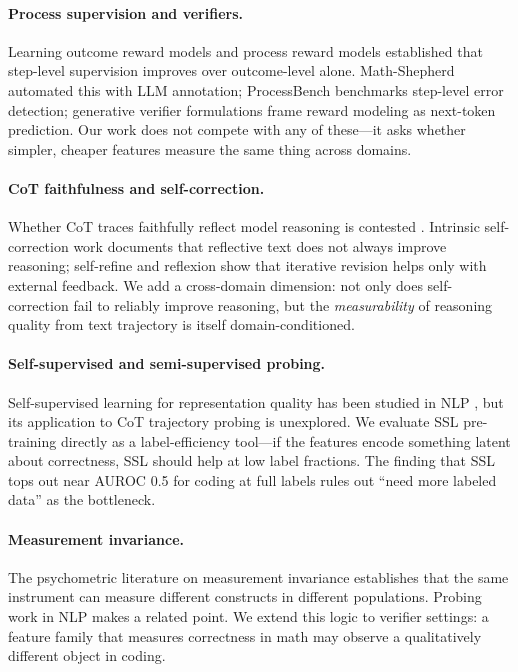 \documentclass[10pt,twocolumn]{article}
\begin{document}
\paragraph{Process supervision and verifiers.} Learning outcome reward models \citep{cobbe2021training} and process reward models \citep{lightman2023verify} established that step-level supervision improves over outcome-level alone. Math-Shepherd \citep{wang2024mathshepherd} automated this with LLM annotation; ProcessBench \citep{zheng2025processbench} benchmarks step-level error detection; generative verifier formulations \citep{zhang2025genrm} frame reward modeling as next-token prediction. Our work does not compete with any of these—it asks whether simpler, cheaper features measure the same thing across domains.

\paragraph{CoT faithfulness and self-correction.} Whether CoT traces faithfully reflect model reasoning is contested \citep{lanham2023faithfulness}. Intrinsic self-correction work \citep{huang2024selfcorrect,liu2024intrinsic} documents that reflective text does not always improve reasoning; self-refine \citep{madaan2023selfrefine} and reflexion \citep{shinn2023reflexion} show that iterative revision helps only with external feedback. We add a cross-domain dimension: not only does self-correction fail to reliably improve reasoning, but the \emph{measurability} of reasoning quality from text trajectory is itself domain-conditioned.

\paragraph{Self-supervised and semi-supervised probing.} Self-supervised learning for representation quality has been studied in NLP \citep{devlin2019bert}, but its application to CoT trajectory probing is unexplored. We evaluate SSL pre-training directly as a label-efficiency tool—if the features encode something latent about correctness, SSL should help at low label fractions. The finding that SSL tops out near AUROC 0.5 for coding at full labels rules out ``need more labeled data'' as the bottleneck.

\paragraph{Measurement invariance.} The psychometric literature on measurement invariance \citep{vandenberg2000review} establishes that the same instrument can measure different constructs in different populations. Probing work in NLP \citep{belinkov2022probing} makes a related point. We extend this logic to verifier settings: a feature family that measures correctness in math may observe a qualitatively different object in coding.
\end{document}
